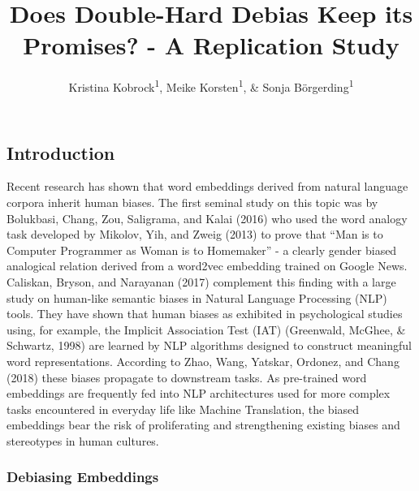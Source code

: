 \documentclass[
  english,
  man,floatsintext]{apa6}
\title{Does Double-Hard Debias Keep its Promises? - A Replication Study}
\author{Kristina Kobrock\textsuperscript{1}, Meike Korsten\textsuperscript{1}, \& Sonja Börgerding\textsuperscript{1}}
\date{}
\affiliation{\vspace{0.5cm}\textsuperscript{1} University of Osnabrück}
\begin{document}
\maketitle

\hypertarget{introduction}{%
\subsection{Introduction}\label{introduction}}

Recent research has shown that word embeddings derived from natural language corpora inherit human biases. The first seminal study on this topic was by Bolukbasi, Chang, Zou, Saligrama, and Kalai (2016) who used the word analogy task developed by Mikolov, Yih, and Zweig (2013) to prove that ``Man is to Computer Programmer as Woman is to Homemaker'' - a clearly gender biased analogical relation derived from a word2vec embedding trained on Google News. Caliskan, Bryson, and Narayanan (2017) complement this finding with a large study on human-like semantic biases in Natural Language Processing (NLP) tools. They have shown that human biases as exhibited in psychological studies using, for example, the Implicit Association Test (IAT) (Greenwald, McGhee, \& Schwartz, 1998) are learned by NLP algorithms designed to construct meaningful word representations. According to Zhao, Wang, Yatskar, Ordonez, and Chang (2018) these biases propagate to downstream tasks. As pre-trained word embeddings are frequently fed into NLP architectures used for more complex tasks encountered in everyday life like Machine Translation, the biased embeddings bear the risk of proliferating and strengthening existing biases and stereotypes in human cultures.

\hypertarget{debiasing-embeddings}{%
\subsubsection{Debiasing Embeddings}\label{debiasing-embeddings}}
\end{document}
